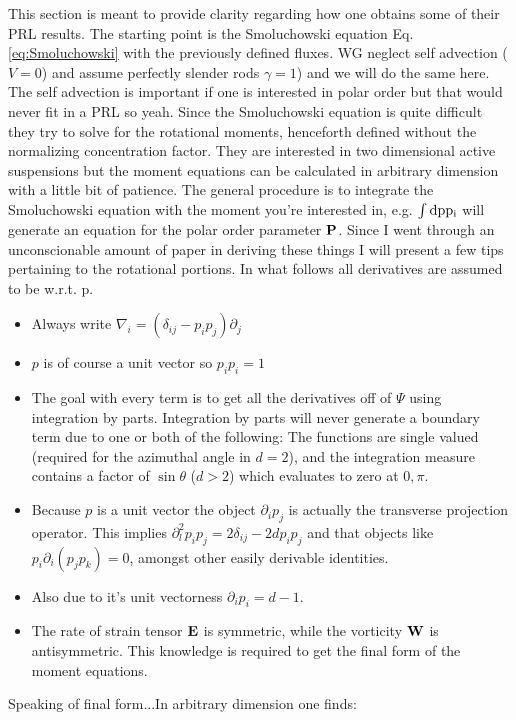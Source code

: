 \documentclass[onecolumn,showpacs,preprintnumbers,prl,amsmath,amssymb]{revtex4-1}
\begin{document}
This section is meant to provide clarity regarding how one obtains some of their PRL results.  The starting point is the Smoluchowski equation Eq. \ref{eq:Smoluchowski} with the previously defined fluxes.  WG neglect self advection ($V=0$) and assume perfectly slender rods $\gamma=1$) and we will do the same here.  The self advection is important if one is interested in polar order but that would never fit in a PRL so yeah.  Since the Smoluchowski equation is quite difficult they try to solve for the rotational moments, henceforth defined without the normalizing concentration factor.  They are interested in two dimensional active suspensions but the moment equations can be calculated in arbitrary dimension with a little bit of patience.  The general procedure is to integrate the Smoluchowski equation with the moment you're interested in, e.g.  $\int\rm{d}p p_i$ will generate an equation for the polar order parameter $\bf{P}$.  Since I went through an unconscionable amount of paper in deriving these things I will present a few tips pertaining to the rotational portions.  In what follows all derivatives are assumed to be w.r.t. p.
\begin{itemize}
	\item Always write $\nabla_i = (\delta_{ij}-p_ip_j)\partial_j$
	\item $p$ is of course a unit vector so $p_ip_i=1$
	\item The goal with every term is to get all the derivatives off of $\Psi$ using integration by parts.  Integration by parts will never generate a boundary term due to one or both of the following: The functions are single valued (required for the azimuthal angle in $d=2$), and the integration measure contains a factor of $\sin \theta$ ($d>2$) which evaluates to zero at $0,\pi$.
	\item Because $p$ is a unit vector the object $\partial_ip_j$ is actually the transverse projection operator.  This implies $\partial_l^2p_ip_j=2\delta_{ij}-2dp_ip_j$ and that objects like $p_i\partial_i(p_jp_k)=0$, amongst other easily derivable identities.
	\item Also due to it's unit vectorness $\partial_ip_i=d-1$.
	\item The rate of strain tensor $\bf{E}$ is symmetric, while the vorticity $\bf{W}$ is antisymmetric.  This knowledge is required to get the final form of the moment equations.
\end{itemize}

Speaking of final form...In arbitrary dimension one finds:
\end{document}
